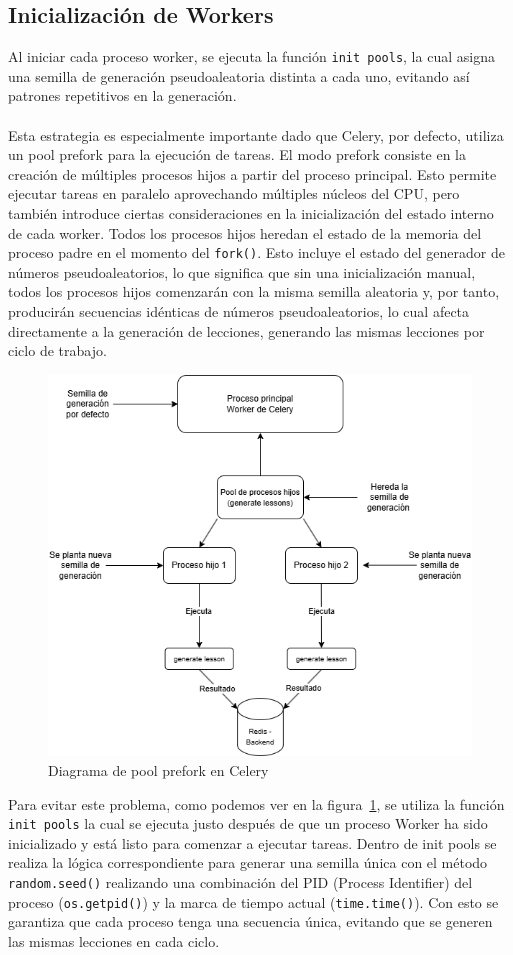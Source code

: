 \subsection{Inicialización de Workers}
Al iniciar cada proceso worker, se ejecuta la función \texttt{init pools}, la cual asigna una semilla de generación pseudoaleatoria distinta a cada uno, evitando así patrones repetitivos en la generación.
\\
\\
Esta estrategia es especialmente importante dado que Celery, por defecto, utiliza un pool prefork para la ejecución de tareas. El modo prefork consiste en la creación de múltiples procesos hijos a partir del proceso principal. Esto permite ejecutar tareas en paralelo aprovechando múltiples núcleos del CPU, pero también introduce ciertas consideraciones en la inicialización del estado interno de cada worker. Todos los procesos hijos heredan el estado de la memoria del proceso padre en el momento del \texttt{fork()}. Esto incluye el estado del generador de números pseudoaleatorios, lo que significa que sin una inicialización manual, todos los procesos hijos comenzarán con la misma semilla aleatoria y, por tanto, producirán secuencias idénticas de números pseudoaleatorios, lo cual afecta directamente a la generación de lecciones, generando las mismas lecciones por ciclo de trabajo.

\begin{figure}[H]
  \centering
  \includegraphics[width=0.7\linewidth]{Imagenes/diagrama de perfork.png}
  \caption{Diagrama de pool prefork en Celery}
  
  \label{fig:prefork}
\end{figure}

Para evitar este problema, como podemos ver en la figura~\ref{fig:prefork}, se utiliza la función \texttt{init pools} la cual se ejecuta justo después de que un proceso Worker ha sido inicializado y está listo para comenzar a ejecutar tareas. Dentro de init pools se realiza la lógica correspondiente para generar una semilla única con el método \texttt{random.seed()} realizando una combinación del PID (Process Identifier) del proceso (\texttt{os.getpid()}) y la marca de tiempo actual (\texttt{time.time()}). Con esto se garantiza que cada proceso tenga una secuencia única, evitando que se generen las mismas lecciones en cada ciclo.

